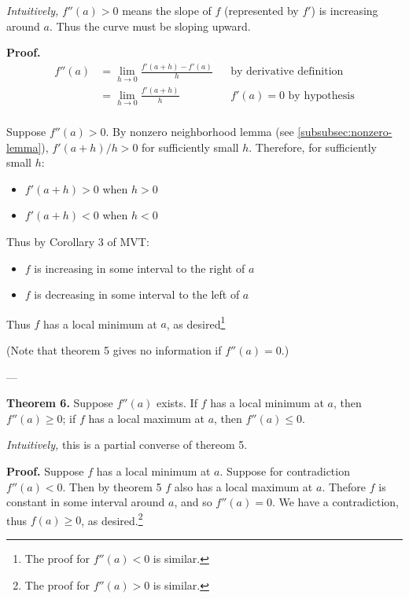 \vs

\textit{Intuitively,} $f''(a)>0$ means the slope of $f$ (represented
by $f'$) is increasing around $a$. Thus the curve must be sloping
upward.

\vs

\textbf{Proof.}
\begin{align*}
  f''(a)&=\lim_{h\to0}\frac{f'(a+h)-f'(a)}{h}&&\text{by derivative definition}\\
        &=\lim_{h\to0}\frac{f'(a+h)}{h}&&\text{$f'(a)=0$ by hypothesis}\\
\end{align*}

Suppose $f''(a)>0$. By nonzero neighborhood lemma (see
\ref{subsubsec:nonzero-lemma}), $f'(a+h)/h>0$ for sufficiently small
$h$. Therefore, for sufficiently small $h$:
\begin{itemize}
\item $f'(a+h)>0$ when $h>0$
\item $f'(a+h)<0$ when $h<0$
\end{itemize}

Thus by Corollary 3 of MVT:
\begin{itemize}
\item $f$ is increasing in some interval to the right of $a$
\item $f$ is decreasing in some interval to the left of $a$
\end{itemize}

Thus $f$ has a local minimum at $a$, as desired\footnote{The proof for
  $f''(a)<0$ is similar.}

\vs

(Note that theorem 5 gives no information if $f''(a)=0$.)

\vs---\vs

\textbf{Theorem 6.} Suppose $f''(a)$ exists. If $f$ has a local
minimum at $a$, then $f''(a)\geq0$; if $f$ has a local maximum at $a$,
then $f''(a)\leq 0$.

\vs

\textit{Intuitively,} this is a partial converse of thereom 5.

\vs

\textbf{Proof.} Suppose $f$ has a local minimum at $a$. Suppose for
contradiction $f''(a)<0$. Then by theorem 5 $f$ also has a local
maximum at $a$. Thefore $f$ is constant in some interval around $a$,
and so $f''(a)=0$. We have a contradiction, thus $f(a)\geq 0$, as
desired.\footnote{The proof for $f''(a)>0$ is similar.}


